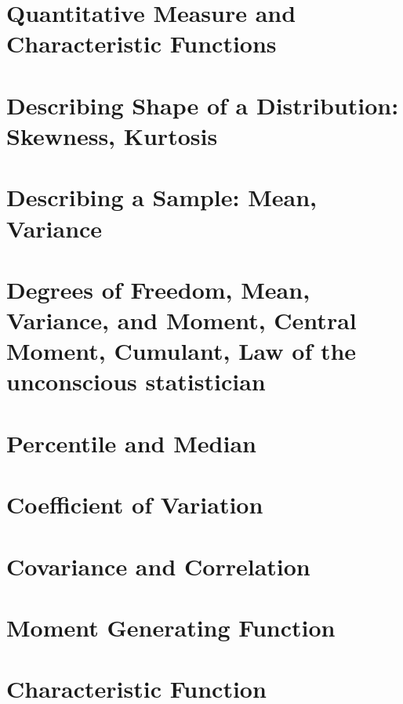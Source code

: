 \section{Quantitative Measure and Characteristic Functions}
\section{Describing Shape of a Distribution: Skewness, Kurtosis}
\section{Describing a Sample: Mean, Variance}
\section{Degrees of Freedom, Mean, Variance, and Moment, Central Moment, Cumulant, Law of the unconscious statistician}
\section{Percentile and Median}
\section{Coefficient of Variation}
\section{Covariance and Correlation}
\section{Moment Generating Function}
\section{Characteristic Function}
